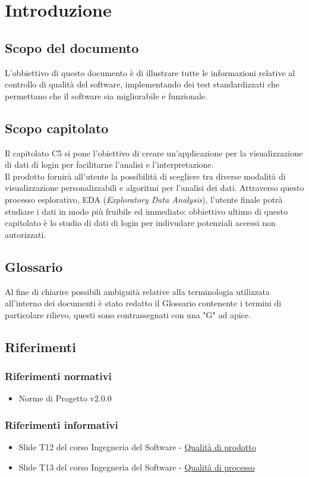 \section{Introduzione}

\subsection{Scopo del documento}

L'obbiettivo di questo documento è di illustrare tutte le informazioni relative al controllo di qualità del software, implementando dei test standardizzati che permettano che il software sia migliorabile e funzionale.

\subsection{Scopo capitolato}
Il capitolato C5 si pone l'obiettivo di creare un'applicazione per la visualizzazione di dati
di login per facilitarne l'analisi e l'interpretazione.\\
Il prodotto fornirà all'utente la possibilità di scegliere tra diverse modalità di visualizzazione personalizzabili 
e algoritmi per l'analisi dei dati. Attraverso questo processo esplorativo, EDA (\textit{Exploratory Data Analysis}), 
l'utente finale potrà studiare i dati in modo più fruibile ed immediato: obbiettivo ultimo di questo capitolato 
è lo studio di dati di login per indivudare potenziali accessi non autorizzati.

\subsection{Glossario}
Al fine di chiarire possibili ambiguità relative alla terminologia utilizzata all'interno dei
documenti è stato redatto il Glossario contenente i termini di particolare rilievo, questi
sono contrassegnati con una "G" ad apice.

\subsection{Riferimenti}
\subsubsection{Riferimenti normativi}
\begin{itemize}
    \item Norme di Progetto v2.0.0
\end{itemize}

\subsubsection{Riferimenti informativi}
\begin{itemize}
    \item Slide T12 del corso Ingegneria del Software -  \href{https://www.math.unipd.it/~tullio/IS-1/2021/Dispense/T12.pdf}{Qualità di prodotto}
    \item Slide T13 del corso Ingegneria del Software - \href{https://www.math.unipd.it/~tullio/IS-1/2021/Dispense/T13.pdf}{Qualità di processo}  
\end{itemize}
\newpage